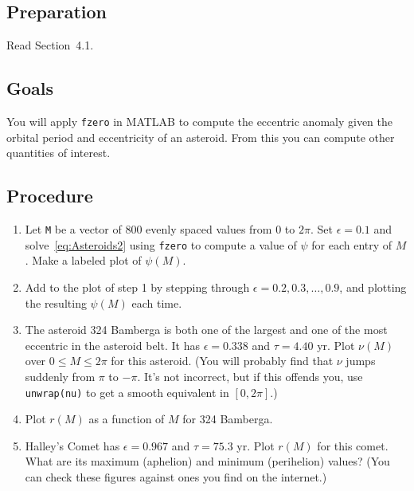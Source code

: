 \documentclass[11pt,twoside]{fncextra}
\begin{document}
\subsection*{Preparation}

Read Section~4.1.

\subsection*{Goals}

You will apply \texttt{fzero} in MATLAB to compute the eccentric anomaly given the orbital period and eccentricity of an asteroid. From this you can compute other quantities of interest.



\subsection*{Procedure}

\begin{enumerate}
\item Let \texttt{M} be a vector of 800 evenly spaced values from $0$ to $2\pi$. Set $\epsilon=0.1$ and solve~\eqref{eq:Asteroids2} using \texttt{fzero} to compute a value of $\psi$ for each entry of $M$. Make a labeled plot of $\psi(M)$.  \item Add to the plot of step 1 by stepping through $\epsilon=0.2,0.3,\ldots,0.9$, and plotting the resulting $\psi(M)$ each time.  \item The asteroid 324 Bamberga is both one of the largest and one of the most eccentric in the asteroid belt. It has $\epsilon = 0.338$ and $\tau = 4.40$ yr. Plot $\nu(M)$ over $0\le M \le 2\pi$ for this asteroid. (You will probably find that $\nu$ jumps suddenly from $\pi$ to $-\pi$. It's not incorrect, but if this offends you, use \texttt{unwrap(nu)} to get a smooth equivalent in $[0,2\pi]$.)
\item Plot $r(M)$ as a function of $M$ for 324 Bamberga.
\item Halley's Comet has $\epsilon=0.967$ and $\tau = 75.3$ yr. Plot $r(M)$ for this comet. What are its maximum (aphelion) and minimum (perihelion) values? (You can check these figures against ones you find on the internet.) 
\end{enumerate}
\end{document}
